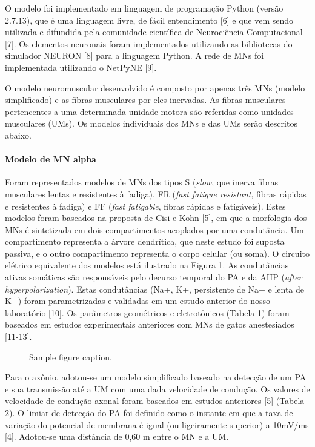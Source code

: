 O modelo foi implementado em linguagem de programação Python (versão 2.7.13), que é uma linguagem livre, de fácil entendimento [6] e que vem sendo utilizada e difundida pela comunidade científica de Neurociência Computacional [7]. Os elementos neuronais foram implementados utilizando as bibliotecas do simulador NEURON [8] para a linguagem Python. A rede de MNs foi implementada utilizando o NetPyNE [9].

O modelo neuromuscular desenvolvido é composto por apenas três MNs (modelo simplificado) e as fibras musculares por eles inervadas. As fibras musculares pertencentes a uma determinada unidade motora são referidas como unidades musculares (UMs). Os modelos individuais dos MNs e das UMs serão descritos abaixo.

\paragraph{Modelo de MN alpha}
Foram representados modelos de MNs dos tipos S (\emph{slow}, que inerva fibras musculares lentas e resistentes à fadiga), FR (\emph{fast fatigue resistant}, fibras rápidas e resistentes à fadiga) e FF (\emph{fast fatigable}, fibras rápidas e fatigáveis). Estes modelos foram baseados na proposta de Cisi e Kohn [5], em que a morfologia dos MNs é sintetizada em dois compartimentos acoplados por uma condutância. Um compartimento representa a árvore dendrítica, que neste estudo foi suposta passiva, e o outro compartimento representa o corpo celular (ou soma). O circuito elétrico equivalente dos modelos está ilustrado na Figura 1. As condutâncias ativas somáticas são responsáveis pelo decurso temporal do PA e da AHP (\emph{after hyperpolarization}). Estas condutâncias (Na+, K+, persistente de Na+ e lenta de K+) foram parametrizadas e validadas em um estudo anterior do nosso laboratório [10]. Os parâmetros geométricos e eletrotônicos (Tabela 1) foram baseados em estudos experimentais anteriores com MNs de gatos anestesiados [11-13].

\begin{figure}
  \centering
  \fbox{\rule[-.5cm]{4cm}{4cm} \rule[-.5cm]{4cm}{0cm}}
  \caption{Sample figure caption.}
  \label{fig:fig1}
\end{figure}

Para o axônio, adotou-se um modelo simplificado baseado na detecção de um PA e sua transmissão até a UM com uma dada velocidade de condução. Os valores de velocidade de condução axonal foram baseados em estudos anteriores [5] (Tabela 2). O limiar de detecção do PA foi definido como o instante em que a taxa de variação do potencial de membrana é igual (ou ligeiramente superior) a 10mV/ms [4]. Adotou-se uma distância de 0,60 m entre o MN e a UM.

